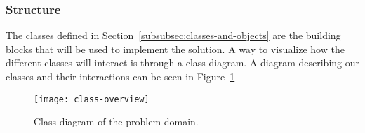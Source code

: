 \subsubsection{Structure}\label{subsubsec:structure}

The classes defined in Section~\ref{subsubsec:classes-and-objects} are the building blocks that will be used
to implement the solution.
A way to visualize how the different classes will interact is through a class diagram.
A diagram describing our classes and their interactions can be seen in Figure~\ref{fig:pda-class-diagram}

\begin{figure}[H]
    \centering
    \texttt{[image: class-overview]}
    \caption{Class diagram of the problem domain.}\label{fig:pda-class-diagram}
\end{figure}
